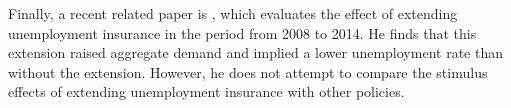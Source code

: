 \documentclass[\econtexRoot/HAFiscal]{subfiles}
\begin{document}
Finally, a recent related paper is \cite{kekre2022unemployment}, which evaluates the effect of extending unemployment insurance in the period from 2008 to 2014. He finds that this extension raised aggregate demand and implied a lower unemployment rate than without the extension. However, he does not attempt to compare the stimulus effects of extending unemployment insurance with other policies. 

\onlyinsubfile{}

\end{document}
